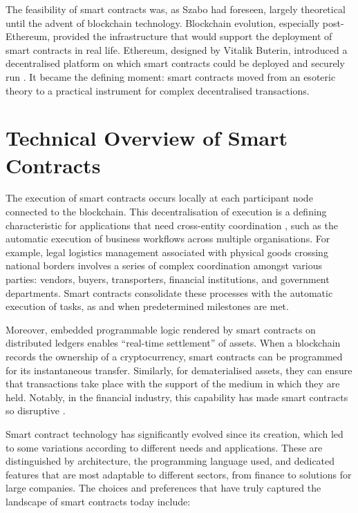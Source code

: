The feasibility of smart contracts was, as Szabo had foreseen, largely theoretical until the advent of blockchain technology. Blockchain evolution, especially post-Ethereum, provided the infrastructure that would support the deployment of smart contracts in real life. Ethereum, designed by Vitalik Buterin, introduced a decentralised platform on which smart contracts could be deployed and securely run \cite{Buterin2014}. It became the defining moment: smart contracts moved from an esoteric theory to a practical instrument for complex decentralised transactions.

\section{Technical Overview of Smart Contracts}

The execution of smart contracts occurs locally at each participant node connected to the blockchain. This decentralisation of execution is a defining characteristic for applications that need cross-entity coordination \cite{MagazzeniEtAl2017}, such as the automatic execution of business workflows across multiple organisations. For example, legal logistics management associated with physical goods crossing national borders involves a series of complex coordination amongst various parties: vendors, buyers, transporters, financial institutions, and government departments. Smart contracts consolidate these processes with the automatic execution of tasks, as and when predetermined milestones are met.

Moreover, embedded programmable logic rendered by smart contracts on distributed ledgers enables ``real-time settlement'' of assets. When a blockchain records the ownership of a cryptocurrency, smart contracts can be programmed for its instantaneous transfer. Similarly, for dematerialised assets, they can ensure that transactions take place with the support of the medium in which they are held. Notably, in the financial industry, this capability has made smart contracts so disruptive \cite{MagazzeniEtAl2017, Smith2020}.


Smart contract technology has significantly evolved since its creation, which led to some variations according to different needs and applications. These are distinguished by architecture, the programming language used, and dedicated features that are most adaptable to different sectors, from finance to solutions for large companies. The choices and preferences that have truly captured the landscape of smart contracts today include:


